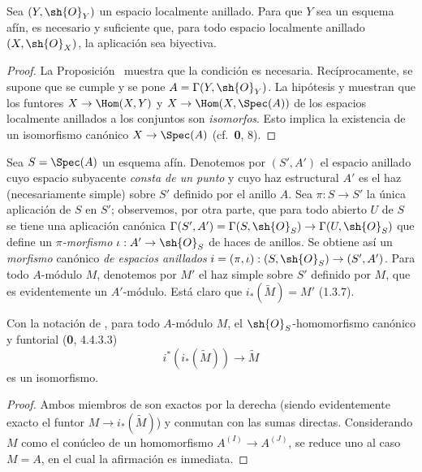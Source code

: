 \begin{corollary}[1.8.3]
\label{ega2:addendum:I.1.8.3-fr}
Sea $(Y,\sh{O}_Y)$ un espacio localmente anillado. Para que $Y$ sea un
esquema afín, es necesario y suficiente que, para todo espacio
localmente anillado $(X,\sh{O}_X)$, la aplicación \textup{} sea
biyectiva.
\end{corollary}

\begin{proof}
La Proposición~ muestra que la condición es necesaria.
Recíprocamente, se supone que se cumple y se pone
$A=\Gamma(Y,\sh{O}_Y)$. La hipótesis y  muestran que los
funtores
$X\to\Hom(X,Y)$ y $X\to\Hom(X,\Spec(A))$
de los espacios localmente anillados a los conjuntos son \emph{isomorfos}.
Esto implica la existencia de un isomorfismo canónico
$X\to\Spec(A)$ (cf.~\textbf 0, 8).
\end{proof}

\begin{env}[1.8.4]
\label{ega2:addendum:I.1.8.4-fr}
Sea $S=\Spec(A)$ un esquema afín. Denotemos por $(S',A')$ el espacio
anillado cuyo espacio subyacente \emph{consta de un punto} y cuyo haz
estructural $A'$ es el haz (necesariamente simple) sobre $S'$ definido
por el anillo $A$. Sea $\pi:S\to S'$ la única aplicación de $S$ en $S'$; observemos, por otra parte, que para todo
abierto $U$ de $S$ se tiene una aplicación canónica
$\Gamma(S',A')=\Gamma(S,\sh{O}_S)\to\Gamma(U,\sh{O}_S)$
que define un \emph{$\pi$-morfismo} $\iota:A'\to\sh{O}_S$ de haces de anillos.
Se obtiene así un \emph{morfismo} canónico \emph{de espacios anillados}
$i=(\pi,\iota):(S,\sh{O}_S)\to(S',A')$.
Para todo $A$-módulo $M$, denotemos por $M'$ el haz simple sobre $S'$
definido por $M$, que es evidentemente un $A'$-módulo. Está claro que
$i_*(\widetilde M)=M'$ (1.3.7).
\end{env}

\begin{lemma}[1.8.5]
\label{ega2:addendum:I.1.8.5-fr}
Con la notación de \textup{}, para todo $A$-módulo $M$, el
$\sh{O}_S$-homomorfismo canónico y funtorial \textup{(\textbf{0}, 4.4.3.3)}
\begin{equation}
\label{ega2:addendum:I.1.8.5.1-fr}
  i^*(i_*(\widetilde M))\to\widetilde M
\tag{1.8.5.1}
\end{equation}
es un isomorfismo.
\end{lemma}

\begin{proof}
Ambos miembros de  son exactos por la derecha
(siendo evidentemente exacto el funtor
$M\to i_*(\widetilde M)$) y conmutan con las sumas directas.
Considerando $M$ como el conúcleo de un homomorfismo
$A^{(I)}\to A^{(J)}$, se reduce uno al caso $M=A$, en el cual la
afirmación es inmediata.
\end{proof}


